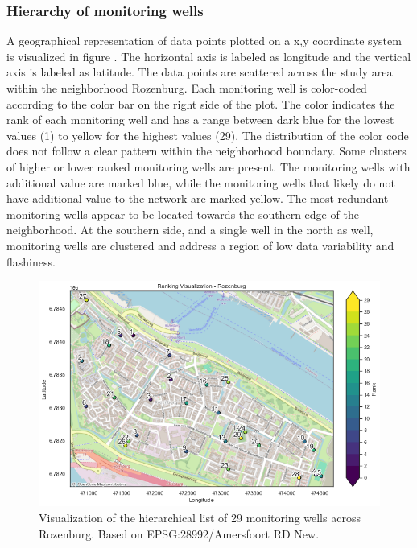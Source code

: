 \subsubsection{Hierarchy of monitoring wells}
A geographical representation of data points plotted on a x,y coordinate system is visualized in figure . The horizontal axis is labeled as longitude and the vertical axis is labeled as latitude. The data points are scattered across the study area within the neighborhood Rozenburg. Each monitoring well is color-coded according to the color bar on the right side of the plot. The color indicates the rank of each monitoring well and has a range between dark blue for the lowest values (1) to yellow for the highest values (29). The distribution of the color code does not follow a clear pattern within the neighborhood boundary. Some clusters of higher or lower ranked monitoring wells are present. The monitoring wells with additional value are marked blue, while the monitoring wells that likely do not have additional value to the network are marked yellow. The most redundant monitoring wells appear to be located towards the southern edge of the neighborhood. At the southern side, and a single well in the north as well, monitoring wells are clustered and address a region of low data variability and flashiness.
\begin{figure}[h]
    \centering
    \includegraphics[width=0.8\linewidth]{frontmatter/Rozenburg-fig/rank.png}
    \caption{Visualization of the hierarchical list of 29 monitoring wells across Rozenburg. Based on EPSG:28992/Amersfoort RD New.}
    \label{rankroz}
\end{figure} 

\newpage

